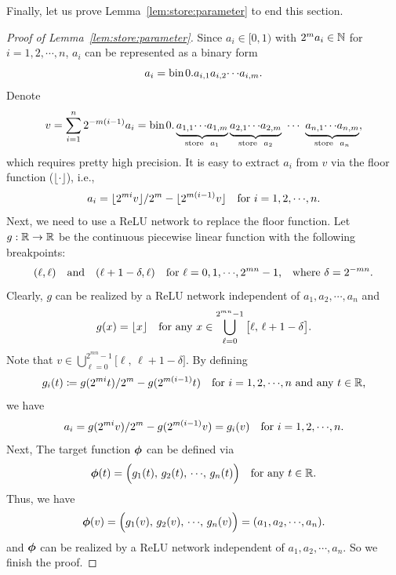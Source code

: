 \documentclass[nohyperref]{article}
\theoremstyle{plain}
\theoremstyle{definition}
\theoremstyle{remark}
\begin{document}
Finally, let us prove Lemma~\ref{lem:store:parameter} to end this section.
\begin{proof}[Proof of Lemma~\ref{lem:store:parameter}]
	Since $a_i\in [0,1)$ with $2^m a_i\in \N$ for $i=1,2,\cdots,n$,  $a_i$ can be represented as a binary form 
	\begin{equation*}
		a_i=\bin 0. a_{i,1}a_{i,2}\cdots  a_{i,m}.
	\end{equation*}
	Denote
	\begin{equation*}
		v=\sum_{i=1}^n 2^{-m(i-1)} a_i
		=\bin 0.
		\underbrace{  a_{1,1}\cdots a_{1,m} }_{\tn{store }\  a_1}
		\underbrace{  a_{2,1}\cdots a_{2,m} }_{\tn{store }\  a_2}
		\   \cdots\ 
		\underbrace{  a_{n,1}\cdots a_{n,m} }_{\tn{store }\ a_n},
	\end{equation*}
	which requires pretty high precision.
	It is easy to extract $a_i$ from $v$ via the floor function ($\lfloor\cdot\rfloor$), i.e.,
	\begin{equation*}
		a_i=\lfloor 2^{mi}v\rfloor / 2^m - \lfloor 2^{m(i-1)}v\rfloor\quad \tn{for $i=1,2,\cdots,n$.}
	\end{equation*}
	Next, we need to use a ReLU network to replace the floor function. Let $g:\R\to\R$ be the continuous piecewise linear function with the following breakpoints:
	\begin{equation*}
		(\ell, \ell)\quad \tn{and}\quad  (\ell+1-\delta,\ell)\quad \tn{for $\ell=0,1,\cdots,2^{mn}-1$,\quad where $\delta=2^{-mn}$.}
	\end{equation*}
	Clearly, $g$ can be realized by a ReLU network independent of $a_1,a_2,\cdots,a_n$ and 
	\begin{equation*}
	    g(x)=\lfloor x\rfloor \quad \textnormal{for any $\displaystyle  x\in \bigcup_{\ell=0}^{2^{mn}-1} \big[\ell,\, \ell+1-\delta\big].$}
	\end{equation*}
	Note that $v\in  \bigcup_{\ell=0}^{2^{mn}-1} \big[\ell,\, \ell+1-\delta\big].$ By defining 
	\begin{equation*}
		g_i(t)\coloneqq  g( 2^{mi}t) / 2^m - g( 2^{m(i-1)} t)\quad \tn{for $i=1,2,\cdots,n$ and any $t\in\R$,}
	\end{equation*}
	we have
	\begin{equation*}
		a_i=g( 2^{mi}v) / 2^m - g( 2^{m(i-1)} v)=g_i(v)\quad \tn{for $i=1,2,\cdots,n$.}
	\end{equation*}
	Next, The target function ${\bm{\phi}}$ can be defined via
	\begin{equation*}
		\bmphi(t)=\Big(g_1(t),\, g_2(t),\,\cdots,\,g_n(t)\Big)\quad \tn{for any $t\in\R$.}
	\end{equation*}
	Thus, we have 
	\begin{equation*}
		\bmphi(v)=\Big(g_1(v),\, g_2(v),\,\cdots,\,g_n(v)\Big)=(a_1,a_2,\cdots,a_n).
	\end{equation*}
	and ${\bm{\phi}}$ can be realized by a ReLU network independent of $a_1,a_2,\cdots,a_n$. So we finish the proof.
\end{proof}
\end{document}
